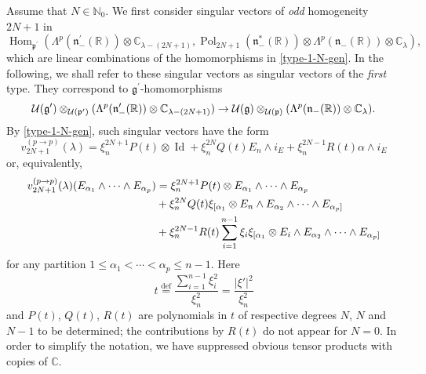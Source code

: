 \documentclass[a4paper,12pt,reqno]{amsart}
\numberwithin{theorem}{subsection}
\numberwithin{equation}{section}
\begin{document}
Assume that $N \in {\mathbb{N}}_0$. We first consider singular vectors of {\em odd}
homogeneity $2N+1$ in
$$
   {\operatorname{Hom}}_{{{\mathfrak p}}^\prime}(\Lambda^{p}({{\mathfrak n}}_-^\prime({\mathbb{R}})) \otimes {\mathbb{C}}_{\lambda-(2N+1)},
   {\operatorname{Pol}}_{2N+1}({{\mathfrak n}}_-^*({\mathbb{R}})) \otimes \Lambda^p({{\mathfrak n}}_-({\mathbb{R}})) \otimes {\mathbb{C}}_\lambda),
$$
which are linear combinations of the homomorphisms in \eqref{type-1-N-gen}. In
the following, we shall refer to these singular vectors as singular vectors of
the {\em first} type. They correspond to ${{\mathfrak g}}^\prime$-homomorphisms
\begin{equation*}
   {\fam2 U}({{\mathfrak g}}^\prime)\otimes_{{\fam2 U}({{\mathfrak p}}^\prime)}(\Lambda^{p}({{\mathfrak n}}_-^\prime({\mathbb{R}})) \otimes
   {\mathbb{C}}_{\lambda-(2N+1)}) \to{\fam2 U}({{\mathfrak g}})\otimes_{{\fam2U}({{\mathfrak p}})}(\Lambda^p({{\mathfrak n}}_-({\mathbb{R}})) \otimes{\mathbb{C}}_\lambda).
\end{equation*}
By \eqref{type-1-N-gen}, such singular vectors have the form
\begin{equation*}
   v_{2N+1}^{(p\to p)}(\lambda) =
   \xi_n^{2N+1} P(t) \otimes {\operatorname{Id}} + \xi_n^{2N} Q(t) E_n \wedge i_E + \xi_n^{2N-1} R(t) \alpha \wedge i_E
\end{equation*}
or, equivalently,
\begin{align}\label{ansatz-odd-2}
   v_{2N+1}^{(p\to p)}(\lambda)(E_{\alpha_1} \wedge \cdots \wedge E_{\alpha_{p}})
   & = \xi_n^{2N+1}P(t) \otimes E_{\alpha_1}\wedge\cdots\wedge E_{\alpha_p} \notag \\
   & + \xi_n^{2N}Q(t)\xi_{[\alpha_1}\otimes E_n\wedge E_{\alpha_2}\wedge\cdots\wedge E_{\alpha_p]} \notag \\
   & + \xi_n^{2N-1}R(t)\sum_{i=1}^{n-1}\xi_i\xi_{[\alpha_1}
   \otimes E_i\wedge E_{\alpha_2}\wedge\cdots\wedge E_{\alpha_p]}
\end{align}
for any partition $1\leq \alpha_1 < \cdots <\alpha_{p} \leq n-1$. Here
$$
   t {\stackrel{\text{def}}{=}} \frac{\sum_{i=1}^{n-1}\xi_i^2}{\xi_n^2} = \frac{{\lvert{\xi'}\rvert}^2}{\xi_n^2}
$$
and $P(t)$, $Q(t)$, $R(t)$ are polynomials in $t$ of respective degrees $N$,
$N$ and $N-1$ to be determined; the contributions by $R(t)$ do not appear for
$N=0$. In order to simplify the notation, we have suppressed obvious tensor
products with copies of ${\mathbb{C}}$.
\end{document}
